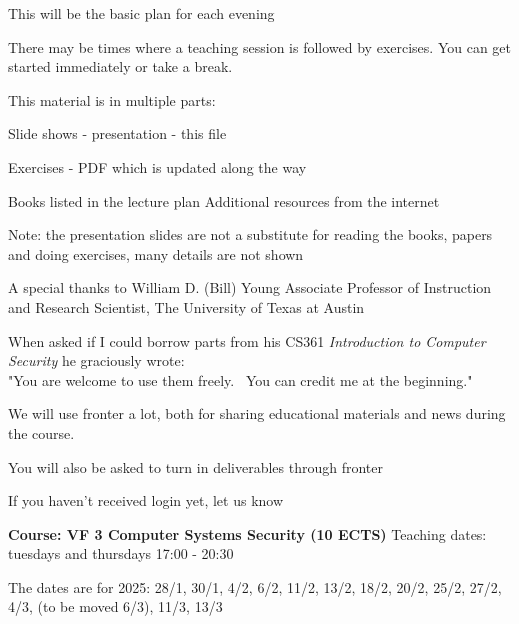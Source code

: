 \documentclass[Screen16to9,17pt]{foils}
\begin{document}
\vskip 1cm
\centerline{\Large This will be the basic plan for each evening}

There may be times where a teaching session is followed by exercises. You can get started immediately or take a break.


\begin{list1}
\item This material is in multiple parts:
\begin{list2}
\item Slide shows - presentation - this file
\item Exercises - PDF which is updated along the way
\end{list2}
\item Books listed in the lecture plan Additional resources from the internet
\end{list1}

Note: the presentation slides are not a substitute for reading the books, papers and doing exercises, many details are not shown

A special thanks to William D. (Bill) Young
Associate Professor of Instruction and Research Scientist,
The University of Texas at Austin

When asked if I could borrow parts from his CS361 \emph{Introduction to Computer Security} he graciously wrote:\\
"You are welcome to use them freely.  You can credit me at the beginning." 




We will use fronter a lot, both for sharing educational materials and news during the course.

You will also be asked to turn in deliverables through fronter


\vskip 5mm
\centerline{If you haven't received login yet, let us know}


{\bf Course: VF 3  Computer Systems Security (10 ECTS)}
Teaching dates: tuesdays and thursdays 17:00 - 20:30

The dates are for 2025: 28/1, 30/1, 4/2, 6/2, 11/2, 13/2, 18/2, 20/2, 25/2, 27/2, 4/3, (to be moved 6/3), 11/3, 13/3
\end{document}

